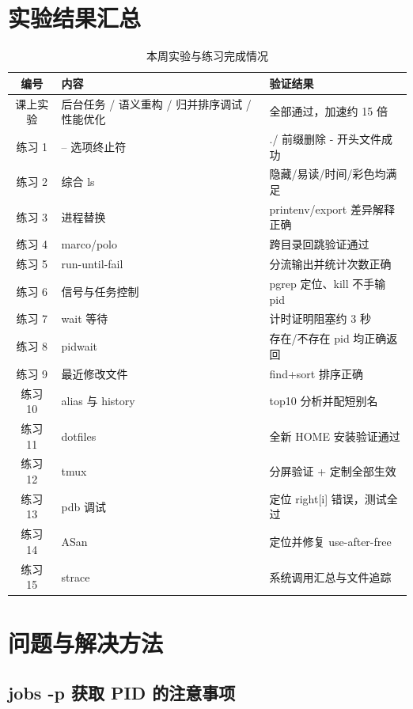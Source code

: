 \documentclass[UTF8]{ctexart}
\begin{document}

\section{实验结果汇总}

\begin{table}[H]
\centering
\caption{本周实验与练习完成情况}
\label{tab:summary}
\begin{tabular}{clp{6.2cm}}
\toprule
编号 & 内容 & 验证结果 \\
\midrule
课上实验 & 后台任务 / 语义重构 / 归并排序调试 / 性能优化 & 全部通过，加速约 15 倍 \\
练习 1 & -- 选项终止符 & ./ 前缀删除 - 开头文件成功 \\
练习 2 & 综合 ls & 隐藏/易读/时间/彩色均满足 \\
练习 3 & 进程替换 & printenv/export 差异解释正确 \\
练习 4 & marco/polo & 跨目录回跳验证通过 \\
练习 5 & run-until-fail & 分流输出并统计次数正确 \\
练习 6 & 信号与任务控制 & pgrep 定位、kill 不手输 pid \\
练习 7 & wait 等待 & 计时证明阻塞约 3 秒 \\
练习 8 & pidwait & 存在/不存在 pid 均正确返回 \\
练习 9 & 最近修改文件 & find+sort 排序正确 \\
练习 10 & alias 与 history & top10 分析并配短别名 \\
练习 11 & dotfiles & 全新 HOME 安装验证通过 \\
练习 12 & tmux & 分屏验证 + 定制全部生效 \\
练习 13 & pdb 调试 & 定位 right[i] 错误，测试全过 \\
练习 14 & ASan & 定位并修复 use-after-free \\
练习 15 & strace & 系统调用汇总与文件追踪 \\
\bottomrule
\end{tabular}
\end{table}

\section{问题与解决方法}

\subsection{jobs -p 获取 PID 的注意事项}
\end{document}
